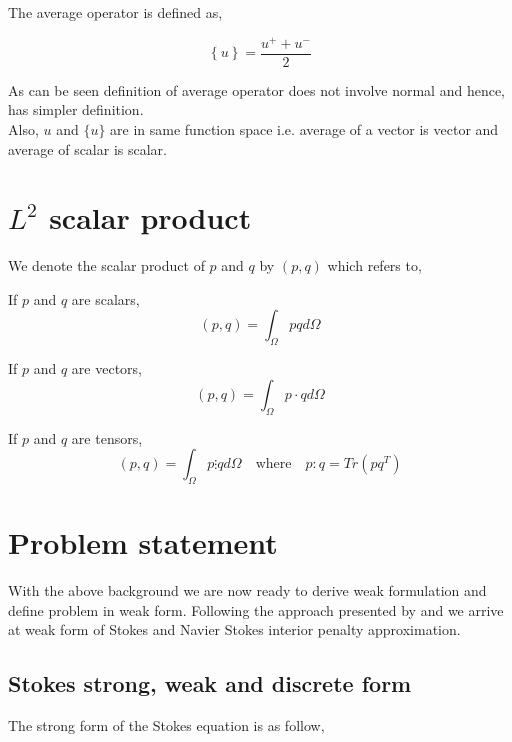 \documentclass[a4paper]{book}
\begin{document}
The average operator is defined as,

\begin{equation}\label{average operator}
\left\lbrace u \right\rbrace = \frac{u^+ + u^-}{2}  
\end{equation} 

As can be seen definition of average operator does not involve normal and hence, has simpler definition.\\
Also, $u$ and $\lbrace u \rbrace$ are in same function space i.e. average of a vector is vector and average of scalar is scalar.\\

\section{$L^2$ scalar product}

We denote the scalar product of $p$ and $q$ by $(p,q)$ which refers to,

If $p$ and $q$ are scalars,
\begin{equation}\label{inner product scalars}
(p,q)=\int_{\Omega} pq d \Omega 
\end{equation}

If $p$ and $q$ are vectors,
\begin{equation}\label{Inner product vectors}
(p,q)=\int_{\Omega} p \cdot q d\Omega
\end{equation}

If $p$ and $q$ are tensors,
\begin{equation}\label{Inner product tensors}
(p,q)=\int_{\Omega} p \vdots q d\Omega \quad \textrm{where} \quad p:q = Tr(pq^T)
\end{equation}

\section{Problem statement}

With the above background we are now ready to derive weak formulation and define problem in weak form. Following the approach presented by \cite{Montlaur} and \cite{Montlaur2} we arrive at weak form of Stokes and Navier Stokes interior penalty approximation.

\subsection{Stokes strong, weak and discrete form} \label{Stokes_flow_ch3}

The strong form of the Stokes equation is as follow,
\end{document}
